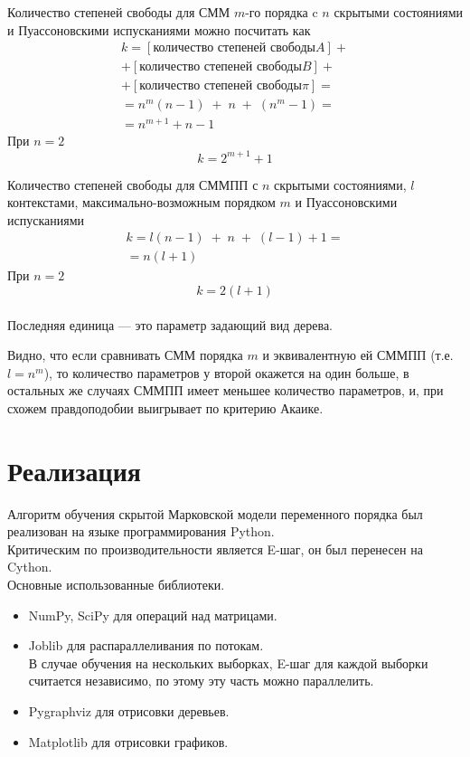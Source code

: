 \documentclass{matmex-diploma-custom}
\begin{document}
Количество степеней свободы для СММ $ m $-го порядка c $ n $ скрытыми состояниями и Пуассоновскими испусканиями можно посчитать как
\begin{align*}
k = [\text{количество степеней свободы} A ] + 
\\+[\text{количество степеней свободы} B ]+
\\+ [\text{количество степеней свободы} \pi ]=
\\ = n^m(n-1)\;+\;n\;+\;(n^m-1) =\\= n^{m+1} + n - 1
\end{align*}
При $n=2$
$$k = 2^{m+1} + 1$$ 

Количество степеней свободы для СММПП с $ n $ скрытыми состояниями, $ l $ контекстами, максимально-возможным порядком $ m $ и Пуассоновскими испусканиями 
\begin{align*}
k =  l(n-1)\;+\;n\;+\;(l-1) + 1  = 
\\=  n(l+1) 
\end{align*}
При $ n=2 $ 
$$k = 2(l+1)$$ 
\\
Последняя единица --- это параметр задающий вид дерева.

Видно, что если сравнивать СММ порядка $m$ и эквивалентную ей СММПП (т.е. $l = n^{m}$), то количество параметров у второй окажется на один больше, в остальных же случаях СММПП имеет меньшее количество параметров, и, при схожем правдоподобии выигрывает по критерию Акаике.


\section{Реализация}
Алгоритм обучения скрытой Марковской модели переменного порядка был реализован на языке программирования Python. 
\\
Критическим по производительности является E-шаг, он был перенесен на Cython.
\\
Основные использованные библиотеки.
\begin{itemize}
\item
NumPy, SciPy для операций над матрицами.
\item
Joblib для распараллеливания по потокам.
\\
В случае обучения на нескольких выборках, E-шаг для каждой выборки считается независимо, по этому эту часть можно параллелить.
\item
Pygraphviz для отрисовки деревьев. 
\item
Matplotlib для отрисовки графиков.
\end{itemize}
\end{document}
